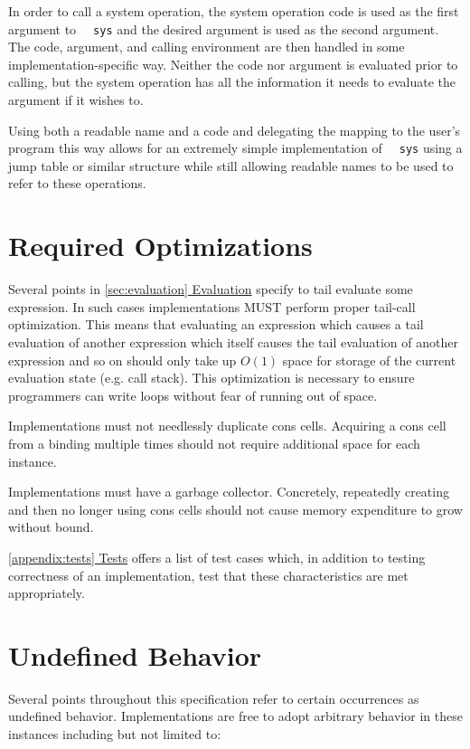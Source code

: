 \documentclass[twocolumn]{report}
\newcommand{\intralink}[2]{\hyperref[#1]{\ref*{#1} #2}}
\begin{document}
In order to call a system operation, the system operation code is used as the first argument to \texttt{~~sys} and the desired argument is used as the second argument.
The code, argument, and calling environment are then handled in some implementation-specific way.
Neither the code nor argument is evaluated prior to calling, but the system operation has all the information it needs to evaluate the argument if it wishes to.

Using both a readable name and a code and delegating the mapping to the user's program this way allows for an extremely simple implementation of \texttt{~~sys} using a jump table or similar structure while still allowing readable names to be used to refer to these operations.

\section{Required Optimizations}
\label{sec:required_optimizations}

Several points in \intralink{sec:evaluation}{Evaluation} specify to tail evaluate some expression.
In such cases implementations MUST perform proper tail-call optimization.
This means that evaluating an expression which causes a tail evaluation of another expression which itself causes the tail evaluation of another expression and so on should only take up $O(1)$ space for storage of the current evaluation state (e.g. call stack).
This optimization is necessary to ensure programmers can write loops without fear of running out of space.

Implementations must not needlessly duplicate cons cells.
Acquiring a cons cell from a binding multiple times should not require additional space for each instance.

Implementations must have a garbage collector.
Concretely, repeatedly creating and then no longer using cons cells should not cause memory expenditure to grow without bound.

\intralink{appendix:tests}{Tests} offers a list of test cases which, in addition to testing correctness of an implementation, test that these characteristics are met appropriately.

\section{Undefined Behavior}
\label{sec:undefined_behavior}

Several points throughout this specification refer to certain occurrences as undefined behavior.
Implementations are free to adopt arbitrary behavior in these instances including but not limited to:
\end{document}
